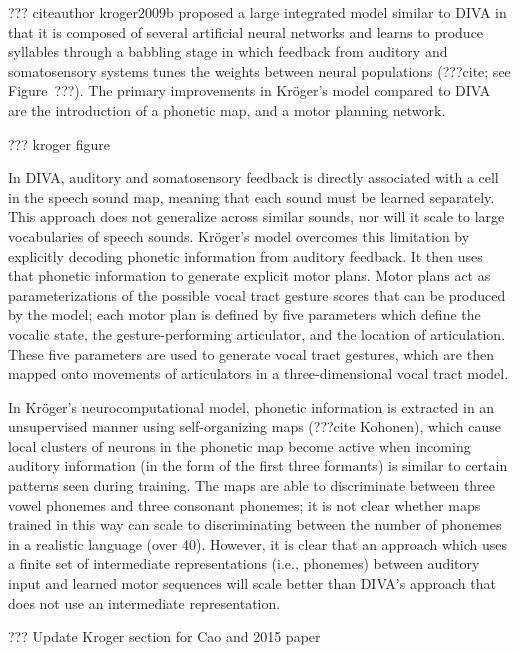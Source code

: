 ??? citeauthor kroger2009b proposed
a large integrated model
similar to DIVA in that
it is composed of
several artificial neural networks
and learns to produce syllables
through a babbling stage
in which feedback from
auditory and somatosensory systems
tunes the weights between
neural populations
(???cite; see Figure~???).
The primary improvements in
Kr\"{o}ger's model compared to DIVA
are the introduction of a phonetic map,
and a motor planning network.

??? kroger figure

In DIVA, auditory and somatosensory feedback
is directly associated with a cell
in the speech sound map,
meaning that each sound must be learned separately.
This approach does not generalize across
similar sounds, nor will it scale
to large vocabularies of speech sounds.
Kr\"{o}ger's model overcomes this limitation
by explicitly decoding phonetic information
from auditory feedback.
It then uses that phonetic information
to generate explicit motor plans.
Motor plans act as parameterizations
of the possible vocal tract gesture scores
that can be produced by the model;
each motor plan is defined by
five parameters which define
the vocalic state,
the gesture-performing articulator,
and the location of articulation.
These five parameters are used
to generate vocal tract gestures,
which are then mapped onto
movements of articulators
in a three-dimensional vocal tract model.

In Kr\"{o}ger's neurocomputational model,
phonetic information is extracted
in an unsupervised manner
using self-organizing maps
(???cite Kohonen),
which cause
local clusters of neurons
in the phonetic map become active
when incoming auditory information
(in the form of the first three formants)
is similar to certain patterns
seen during training.
The maps are able to
discriminate between three vowel phonemes
and three consonant phonemes;
it is not clear whether
maps trained in this way
can scale to discriminating
between the number of phonemes
in a realistic language (over 40).
However, it is clear that an approach
which uses a finite set of intermediate representations
(i.e., phonemes)
between auditory input
and learned motor sequences
will scale better than DIVA's approach
that does not use an intermediate representation.

??? Update Kroger section for Cao and 2015 paper

